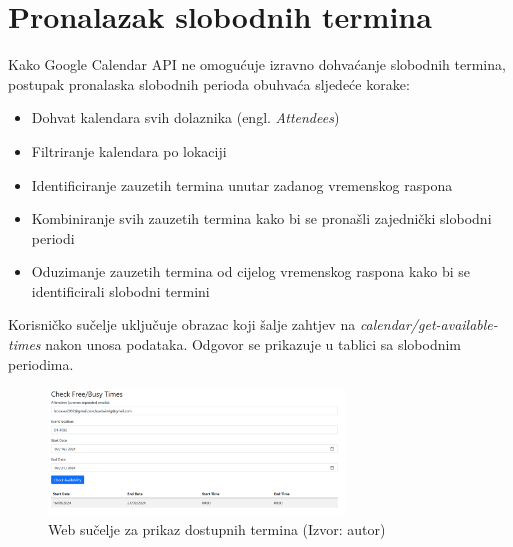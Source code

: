 \documentclass{foi}
\begin{document}
\section{Pronalazak slobodnih termina}
Kako Google Calendar API ne omogućuje izravno dohvaćanje slobodnih termina, postupak pronalaska slobodnih perioda obuhvaća sljedeće korake:
\begin{itemize}
    \item Dohvat kalendara svih dolaznika (engl. \textit{Attendees})
    \item Filtriranje kalendara po lokaciji
    \item Identificiranje zauzetih termina unutar zadanog vremenskog raspona
    \item Kombiniranje svih zauzetih termina kako bi se pronašli zajednički slobodni periodi
    \item Oduzimanje zauzetih termina od cijelog vremenskog raspona kako bi se identificirali slobodni termini
\end{itemize}

Korisničko sučelje uključuje obrazac koji šalje zahtjev na \textit{calendar/get-available-times} nakon unosa podataka. Odgovor se prikazuje u tablici sa slobodnim periodima.

\begin{figure}[H]
    \centering
    \includegraphics[width=0.7\textwidth]{slike/timesAvaileble.png}
    \caption{Web sučelje za prikaz dostupnih termina (Izvor: autor)}
    \label{fig:UserInterfaceAvailible}
\end{figure}
\end{document}
